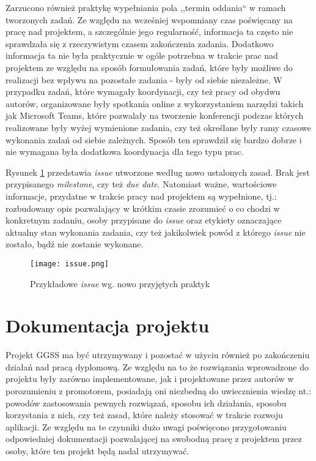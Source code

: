 Zarzucono również praktykę wypełniania pola ,,termin oddania`` w ramach tworzonych zadań. Ze względu na  wcześniej wspomniany czas poświęcany na pracę nad projektem, a szczególnie jego regularność, informacja ta często nie sprawdzała się z rzeczywistym czasem zakończenia zadania. Dodatkowo informacja ta nie była praktycznie w ogóle potrzebna w trakcie prac nad projektem ze względu na sposób formułowania zadań, które były możliwe do realizacji bez wpływu na pozostałe zadania - były od siebie niezależne. W przypadku zadań, które wymagały koordynacji, czy też pracy od obydwu autorów, organizowane były spotkania online z wykorzystaniem narzędzi takich jak Microsoft Teams, które pozwalały na tworzenie konferencji podczas których realizowane były wyżej wymienione zadania, czy też określane były ramy czasowe wykonania zadań od siebie zależnych. Sposób ten sprawdził się bardzo dobrze i nie wymagana była dodatkowa koordynacja dla tego typu prac.

Rysunek \ref{fig:issue} przedstawia \emph{issue} utworzone według nowo ustalonych zasad. Brak jest przypisanego \emph{milestone}, czy też \emph{due date}. Natomiast ważne, wartościowe informacje, przydatne w trakcie pracy nad projektem są wypełnione, tj.: rozbudowany opis pozwalający w krótkim czasie zrozumieć o co chodzi w konkretnym zadaniu, osoby przypisane do \emph{issue} oraz etykiety oznaczające aktualny stan wykonania zadania, czy też jakikolwiek powód z którego \emph{issue} nie zostało, bądź nie zostanie wykonane.

\begin{figure}[H]
    \centering
    \texttt{[image: issue.png]}
    \caption{Przykładowe \emph{issue} wg. nowo przyjętych praktyk}
    \label{fig:issue}
\end{figure}


\newpage
\section{Dokumentacja projektu}

Projekt GGSS ma być utrzymywany i pozostać w użyciu również po zakończeniu działań nad pracą dyplomową. Ze względu na to że rozwiązania wprowadzone do projektu były zarówno implementowane, jak i projektowane przez autorów w porozumieniu z promotorem, posiadają oni niezbedną do uwiecznienia wiedzę nt.: powodów zastosowania pewnych rozwiązań, sposobu ich działania, sposobu korzystania z nich, czy też zasad, które należy stosować w trakcie rozwoju aplikacji. Ze względu na te czynniki dużo uwagi poświęcono przygotowaniu odpowiedniej dokumentacji pozwalającej na swobodną pracę z projektem przez osoby, które ten projekt będą nadal utrzymywać.

